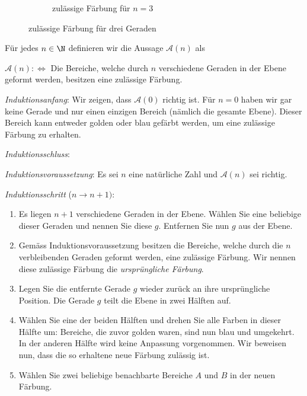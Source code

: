 \begin{myanswer}[myexercise:0207]
\begin{figure}[H]
\begin{subfigure}[b]{0.45\textwidth}
			\caption{zulässige Färbung für $n=3$}
			\label{subfig:3linesFilled}
		\end{subfigure}
		\caption{zulässige Färbung für drei Geraden}
		\label{fig:3lines}
	\end{figure}
	Für jedes $n\in\N$ definieren wir die Aussage $\mathcal{A}(n)$ als
	\begin{center}
		$\mathcal{A}(n) :\iff $ Die Bereiche, welche durch $n$ verschiedene Geraden in der Ebene geformt werden, besitzen eine zulässige Färbung.
	\end{center}
	\begin{aenum}
		\item \textit{Induktionsanfang}: Wir zeigen, dass $\mathcal{A}(0)$ richtig ist. Für $n=0$ haben wir gar keine Gerade und nur einen einzigen Bereich (nämlich die gesamte Ebene). Dieser Bereich kann entweder golden oder blau gefärbt werden, um eine zulässige Färbung zu erhalten.
		\item \textit{Induktionsschluss}:
		\begin{renum}
			\item \textit{Induktionsvoraussetzung}: Es sei $n$ eine natürliche Zahl und $\mathcal{A}(n)$ sei richtig.
			\item \textit{Induktionsschritt} ($n\to n+1)$:
			\begin{enumerate}
				\item Es liegen $n+1$ verschiedene Geraden in der Ebene. Wählen Sie eine beliebige dieser Geraden und nennen Sie diese $g$. Entfernen Sie nun $g$ aus der Ebene.
				\item Gemäss Induktionsvoraussetzung besitzen die Bereiche, welche durch die $n$ verbleibenden Geraden geformt werden, eine zulässige Färbung. Wir nennen diese zulässige Färbung die \textit{ursprüngliche Färbung}.
				\item Legen Sie die entfernte Gerade $g$ wieder zurück an ihre ursprüngliche Position. Die Gerade $g$ teilt die Ebene in zwei Hälften auf.
				\item Wählen Sie eine der beiden Hälften und drehen Sie alle Farben in dieser Hälfte um: Bereiche, die zuvor golden waren, sind nun blau und umgekehrt. In der anderen Hälfte wird keine Anpassung vorgenommen. Wir beweisen nun, dass die so erhaltene neue Färbung zulässig ist.
				\item Wählen Sie zwei beliebige benachbarte Bereiche $A$ und $B$ in der neuen Färbung.

\end{enumerate}
\end{renum}
\end{aenum}
\end{myanswer}
